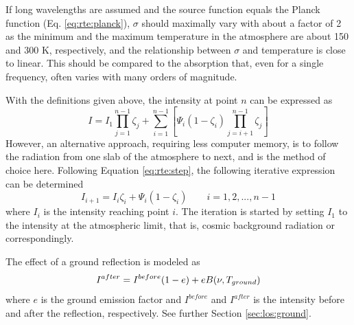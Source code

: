   If long wavelengths are assumed and the source function equals the
  Planck function (Eq.  \ref{eq:rte:planck}), $\sigma$ should
  maximally vary with about a factor of 2 as the minimum and the
  maximum temperature in the atmosphere are about 150 and 300 K,
  respectively, and the relationship between $\sigma$ and temperature
  is close to linear.  This should be compared to the absorption that,
  even for a single frequency, often varies with many orders of
  magnitude.


  \label{sec:rte:solving}
  
  With the definitions given above, the intensity at point $n$ can be
  expressed as
 \begin{equation}
   I = I_1 \prod_{j=1}^{n-1}\zeta_j + 
       \sum_{i=1}^{n-1}\left[\Psi_i(1-\zeta_i)\prod_{j=i+1}^{n-1}\zeta_j\right]
  \label{eq:rte:rteprod}
 \end{equation}
 However, an alternative approach, requiring less computer memory, is
 to follow the radiation from one slab of the atmosphere to next, and
 is the method of choice here. Following Equation \ref{eq:rte:step},
 the following iterative expression can be determined
 \citep{eriksson:97a}
 \begin{equation}
   I_{i+1} = I_i\zeta_i + \Psi_i\left(1-\zeta_i\right)\qquad i=1,2,...,n-1
  \label{eq:rte:iteration}
 \end{equation}
 where $I_i$ is the intensity reaching point $i$.
 The iteration is started by setting $I_1$ to the intensity at the 
 atmospheric limit, that is, cosmic background radiation or correspondingly.


  \label{sec:rte:ground}

 The effect of a ground reflection is modeled as
 \begin{equation}
   I^{after} = I^{before}(1-e) + eB(\nu,T_{ground})
  \label{eq:rte:ground}
 \end{equation} 
 where $e$ is the ground emission factor and $I^{before}$ and
 $I^{after}$ is the intensity before and after the reflection,
 respectively. See further Section \ref{sec:los:ground}.


 \label{sec:rte:trans}
  
